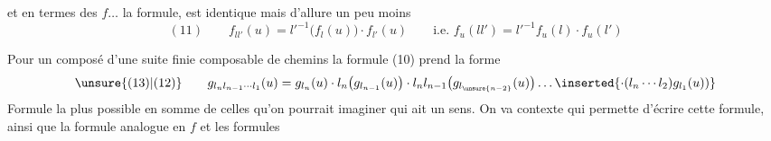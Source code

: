 et en termes des $f\ldots$ la formule, est identique mais d'allure un peu moins 
\[
(11)\qquad f_{ll'}(u)=l'^{-1}\bigl(f_l(u)\bigr)\cdot f_{l'}(u)
\qquad\text{i.e. }f_u(ll')=l'^{-1}f_u(l)\cdot f_u(l')
\]


Pour un composé d'une  suite finie composable de chemins
la formule (10) prend la forme
\[
\unsure{(13)|(12)}\qquad
 g_{l_nl_{n-1}\cdots l_1}(u)=g_{l_n}(u)\cdot l_n\bigl(g_{l_{n-1}}(u)\bigr)\cdot l_nl_{n-1}\bigl(g_{l_{\unsure{n-2}}}(u)\bigr)\ldots
 \inserted{\cdot(l_n\cdots l_2)g_{l_1}(u))}
\]
Formule la plus   possible en somme de celles qu'on pourrait imaginer qui ait un sens. On va    contexte qui permette  d'écrire cette formule, ainsi que  la formule analogue en $f$ et les formules
